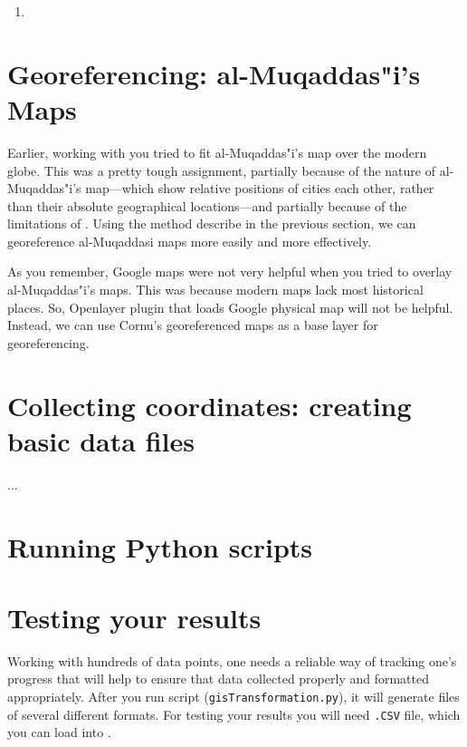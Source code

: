 \documentclass[12pt,oneside]{article}
\begin{document}
\begin{enumerate}
\item 
\end{enumerate}

\section{Georeferencing: al-Muqaddas"i's Maps}

Earlier, working with \GoogleEarth you tried to fit al-Muqaddas"i's map over the modern globe. This was a pretty tough assignment, partially because of the nature of al-Muqaddas"i's map---which show relative positions of cities \visavis each other, rather than their absolute geographical locations---and partially because of the limitations of \GoogleEarth. Using the method describe in the previous section, we can georeference al-Muqaddasi maps more easily and more effectively.

As you remember, Google maps were not very helpful when you tried to overlay al-Muqaddas"i's maps. This was because modern maps lack most historical places. So, Openlayer plugin that loads Google physical map will not be helpful. Instead, we can use Cornu's georeferenced maps as a base layer for georeferencing.

\section{Collecting coordinates: creating basic data files}

...

\section{Running Python scripts}



\section{Testing your results}

Working with hundreds of data points, one needs a reliable way of tracking one's progress that will help to ensure that data collected properly and formatted appropriately. After you run \Python script (\texttt{gisTransformation.py}), it will generate files of several different formats. For testing your results you will need \texttt{.CSV} file, which you can load into \QGIS.
\end{document}

